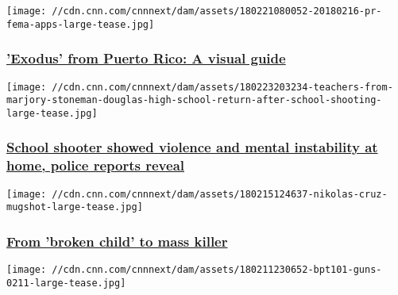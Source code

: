 \href{/2018/02/21/us/puerto-rico-migration-data-invs/index.html}{}

\texttt{[image: //cdn.cnn.com/cnnnext/dam/assets/180221080052-20180216-pr-fema-apps-large-tease.jpg]}

\hypertarget{exodus-from-puerto-rico-a-visual-guide}{%
\subsubsection{\texorpdfstring{\href{/2018/02/21/us/puerto-rico-migration-data-invs/index.html}{'Exodus'
from Puerto Rico: A visual
guide}}{'Exodus' from Puerto Rico: A visual guide}}\label{exodus-from-puerto-rico-a-visual-guide}}

\href{/2018/02/16/us/florida-shooter-cruz-records-police-calls-to-home-invs/index.html}{}

\texttt{[image: //cdn.cnn.com/cnnnext/dam/assets/180223203234-teachers-from-marjory-stoneman-douglas-high-school-return-after-school-shooting-large-tease.jpg]}

\hypertarget{school-shooter-showed-violence-and-mental-instability-at-home-police-reports-reveal}{%
\subsubsection{\texorpdfstring{\href{/2018/02/16/us/florida-shooter-cruz-records-police-calls-to-home-invs/index.html}{School
shooter showed violence and mental instability at home, police reports
reveal}}{School shooter showed violence and mental instability at home, police reports reveal}}\label{school-shooter-showed-violence-and-mental-instability-at-home-police-reports-reveal}}

\href{/2018/02/16/us/shooter-profile-invs/index.html}{}

\texttt{[image: //cdn.cnn.com/cnnnext/dam/assets/180215124637-nikolas-cruz-mugshot-large-tease.jpg]}

\hypertarget{from-broken-child-to-mass-killer}{%
\subsubsection{\texorpdfstring{\href{/2018/02/16/us/shooter-profile-invs/index.html}{From
'broken child' to mass
killer}}{From 'broken child' to mass killer}}\label{from-broken-child-to-mass-killer}}

\href{/2018/02/12/us/gun-background-check-backlog-military-dishonorable-discharge-invs/index.html}{}

\texttt{[image: //cdn.cnn.com/cnnnext/dam/assets/180211230652-bpt101-guns-0211-large-tease.jpg]}

